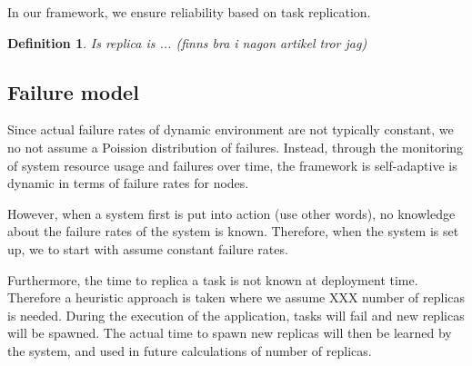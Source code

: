 \documentclass{cslthse-msc}
\newtheorem{definition}{Definition}[chapter]
\begin{document}
In our framework, we ensure reliability based on task replication.
\begin{definition} \label{def:task_replica}
Is replica is ... (finns bra i nagon artikel tror jag)
\end{definition}

\subsection{Failure model}
Since actual failure rates of dynamic environment are not typically constant, we no not assume a Poission distribution of failures. Instead, through the monitoring of system resource usage and failures over time, the framework is self-adaptive is dynamic in terms of failure rates for nodes.

However, when a system first is put into action (use other words), no knowledge about the failure rates of the system is known. Therefore, when the system is set up, we to start with assume constant failure rates.

Furthermore, the time to replica a task is not known at deployment time. Therefore a heuristic approach is taken where we assume XXX number of replicas is needed. During the execution of the application, tasks will fail and new replicas will be spawned. The actual time to spawn new replicas will then be learned by the system, and used in future calculations of number of replicas.
\end{document}
